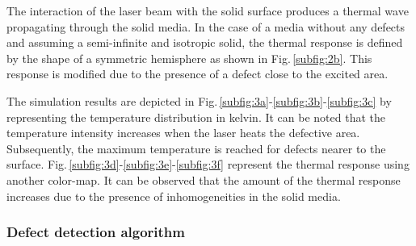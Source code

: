 \documentclass[12pt]{spieman}
\begin{document}
\begin{spacing}{2}
  


The interaction of the laser beam with the solid surface produces a thermal wave propagating through the solid media. In the case of a media without any defects and assuming a semi-infinite and isotropic solid, the thermal response is defined by the shape of a symmetric hemisphere\cite{Li2011} as shown in Fig.\,\ref{subfig:2b}. This response is modified due to the presence of a defect close to the excited area.

The simulation results are depicted in Fig.\,\ref{subfig:3a}-\ref{subfig:3b}-\ref{subfig:3c} by representing the temperature distribution in kelvin. It can be noted that the temperature intensity increases when the laser heats the defective area. Subsequently, the maximum temperature is reached for defects nearer to the surface. Fig.\,\ref{subfig:3d}-\ref{subfig:3e}-\ref{subfig:3f} represent the thermal response using another color-map. It can be observed that the amount of the thermal response increases due to the presence of inhomogeneities in the solid media.
	
\subsubsection{Defect detection algorithm}\label{subsec:312}

%


\end{spacing}
\end{document}
